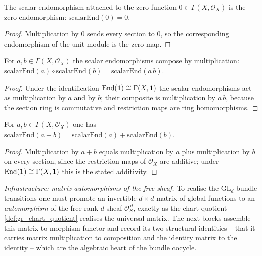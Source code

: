 \begin{lemma}\leanok
  \label{lem:gr_scalarEnd_zero}
  The scalar endomorphism attached to the zero function \(0 \in
  \Gamma(X, \mathcal{O}_X)\) is the zero endomorphism:
  \(\mathrm{scalarEnd}(0) = 0\).
\end{lemma}

\begin{proof}
  Multiplication by \(0\) sends every section to \(0\), so the corresponding
  endomorphism of the unit module is the zero map.
\end{proof}

\begin{lemma}\leanok
  \label{lem:gr_scalarEnd_comp}
  For \(a, b \in \Gamma(X, \mathcal{O}_X)\) the scalar endomorphisms compose by
  multiplication: \(\mathrm{scalarEnd}(a) \circ \mathrm{scalarEnd}(b) =
  \mathrm{scalarEnd}(a\,b)\).
\end{lemma}
\begin{proof}
  Under the identification \(\operatorname{End}(\mathbf{1}) \cong \Gamma(X, \mathbf{1})\) the
  scalar endomorphisms act as multiplication by \(a\) and by \(b\); their composite
  is multiplication by \(a\,b\), because the section ring is commutative and
  restriction maps are ring homomorphisms.
\end{proof}

\begin{lemma}\leanok
  \label{lem:gr_scalarEnd_add}
  For \(a, b \in \Gamma(X, \mathcal{O}_X)\) one has \(\mathrm{scalarEnd}(a + b) =
  \mathrm{scalarEnd}(a) + \mathrm{scalarEnd}(b)\).
\end{lemma}
\begin{proof}
  Multiplication by \(a + b\) equals multiplication by \(a\) plus multiplication by
  \(b\) on every section, since the restriction maps of \(\mathcal{O}_X\) are additive;
  under \(\operatorname{End}(\mathbf{1}) \cong \Gamma(X, \mathbf{1})\) this is the stated additivity.
\end{proof}


\emph{Infrastructure: matrix automorphisms of the free sheaf.} To realise the
\(\mathrm{GL}_d\) bundle transitions one must promote an invertible \(d \times d\)
matrix of global functions to an \emph{automorphism} of the free rank-\(d\) sheaf
\(\mathcal{O}_S^{\,d}\), exactly as the chart quotient \cref{def:gr_chart_quotient}
realises the universal matrix. The next blocks assemble this matrix-to-morphism
functor and record its two structural identities -- that it carries matrix
multiplication to composition and the identity matrix to the identity -- which are
the algebraic heart of the bundle cocycle.

